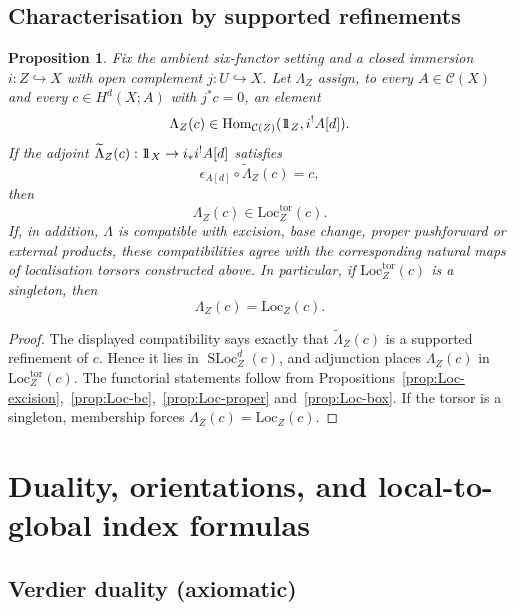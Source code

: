 \documentclass[10pt,a4paper,dvipsnames,x11names]{amsart}
\newcommand{\one}{1\hskip-3.5pt1}
\newcommand{\C}{\mathcal C}
\newcommand{\Hom}{\mathrm{Hom}}
\newcommand{\Loc}{\mathrm{Loc}}
\newcommand{\SLoc}{\operatorname{SLoc}}
\numberwithin{equation}{section}
\theoremstyle{plain}
\newtheorem{proposition}[proposition]{Proposition}
\theoremstyle{definition}
\theoremstyle{remark}
\begin{document}
\subsection{Characterisation by supported refinements}

\begin{proposition} \label{thm:Loc-universal}
Fix the ambient six-functor setting and a closed immersion $i:Z\hookrightarrow X$ with open complement $j:U\hookrightarrow X$.
Let $\Lambda_Z$ assign, to every $A\in\C(X)$ and every $c\in H^d(X;A)$ with $j^*c=0$, an element
\[
\Lambda_Z(c)\in \Hom_{\C(Z)}(\one_Z,i^!A[d]).
\]
If the adjoint $\widetilde\Lambda_Z(c):\one_X\to i_*i^!A[d]$ satisfies
\[
\epsilon_{A[d]}\circ\widetilde\Lambda_Z(c)=c,
\]
then
\[
\Lambda_Z(c)\in\Loc_Z^{\mathrm{tor}}(c).
\]
If, in addition, $\Lambda$ is compatible with excision, base change, proper pushforward or external products, these compatibilities agree with the corresponding natural maps of localisation torsors constructed above.  In particular, if $\Loc_Z^{\mathrm{tor}}(c)$ is a singleton, then
\[
\Lambda_Z(c)=\Loc_Z(c).
\]
\end{proposition}

\begin{proof}
The displayed compatibility says exactly that $\widetilde\Lambda_Z(c)$ is a supported refinement of $c$.  Hence it lies in $\SLoc_Z^d(c)$, and adjunction places $\Lambda_Z(c)$ in $\Loc_Z^{\mathrm{tor}}(c)$.  The functorial statements follow from Propositions~\ref{prop:Loc-excision},~\ref{prop:Loc-bc},~\ref{prop:Loc-proper} and~\ref{prop:Loc-box}.  If the torsor is a singleton, membership forces $\Lambda_Z(c)=\Loc_Z(c)$.
\end{proof}



\section{Duality, orientations, and local-to-global index formulas}\label{sec:dual}

\subsection{Verdier duality (axiomatic)}
\end{document}
